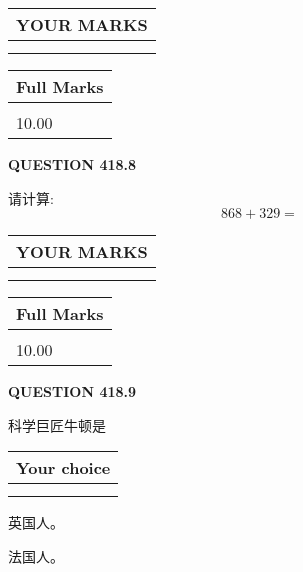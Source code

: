 \documentclass{ctexart}
\begin{document}
 

 
  
\vspace{0.2in}
  
\noindent\begin{tabular}{|l|}
\hline
 YOUR MARKS  \\
\hline
 \\ 
 \\ 
\hline
\end{tabular}
\hspace{0.05in} \begin{tabular}{|l|}
\hline
 Full Marks  \\
\hline
 \\ 
10.00 \\
\hline
\end{tabular}
{\textbf{\Large{QUESTION
418.8 
}}}
  
  
 
请计算:
\begin{equation}
868 +  %
329 = \nonumber
\end{equation}
 

 

 
  
\vspace{0.2in}
  
\noindent\begin{tabular}{|l|}
\hline
 YOUR MARKS  \\
\hline
 \\ 
 \\ 
\hline
\end{tabular}
\hspace{0.05in} \begin{tabular}{|l|}
\hline
 Full Marks  \\
\hline
 \\ 
10.00 \\
\hline
\end{tabular}
{\textbf{\Large{QUESTION
418.9 
}}}
  
  
科学巨匠牛顿是
  
  
\noindent\hspace{3.0in} \begin{tabular}{|l|}
\hline
Your choice \\
\hline
 \\ 
 \\ 
\hline
\end{tabular}
  
  
 
 
英国人。
 
 
法国人。
 
\end{document}
